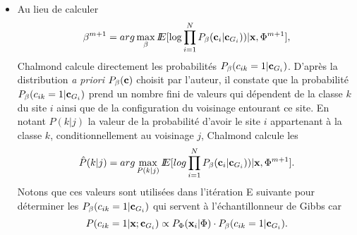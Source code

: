 \begin{enumerate}
\begin{itemize}
\begin{itemize}
\item  Au lieu de calculer 
$$
\beta^{m+1}=arg \max_{\beta} I\!\!E[\log \prod_{i=1}^N  P_{\beta}(\mbox{\bf c}_i | \mbox{\bf c}_{G_i})) 
 | \mbox{\bf x}, \Phi^{m+1}],
$$
Chalmond calcule directement les probabilit\'es $P_{\beta}(c_{ik}=1 | \mbox{\bf c}_{G_i})$.
D'apr\`es la distribution {\em a priori} $P_{\beta}(\mbox{\bf c})$ choisit par 
l'auteur, il constate que la probabilit\'e $P_{\beta}(c_{ik}=1 | \mbox{\bf c}_{G_i})$
prend un nombre fini de valeurs qui d\'ependent de la classe $k$ du
site $i$ ainsi que de la configuration du voisinage entourant ce site.
En notant $P(k | j)$ la valeur de la probabilit\'e d'avoir le site $i$
appartenant \`a la classe $k$, conditionnellement au voisinage $j$,
Chalmond calcule les 
$$
\hat{P}(k | j)=arg \max_{P(k | j)} I\!\!E[log  \prod_{i=1}^N  P_{\beta}(\mbox{\bf c}_i | \mbox{\bf c}_{G_i})) 
 | \mbox{\bf x}, \Phi^{m+1}].
$$
Notons que ces valeurs sont utilis\'ees  dans l'it\'eration E suivante pour d\'eterminer
les $P_{\beta}(c_{ik}=1 | \mbox{\bf c}_{G_i})$ qui servent \`a l'\'echantillonneur de 
Gibbs car 
\[
P(c_{ik} = 1 | \mbox{\bf x} ; \mbox{\bf c}_{G_i}) \propto P_{\Phi}(\mbox{\bf x}_i | \Phi) \cdot P_{\beta}(c_{ik}=1 | \mbox{\bf c}_{G_i}).
\]
\end{itemize} 
\end{itemize}
\end{enumerate} 








